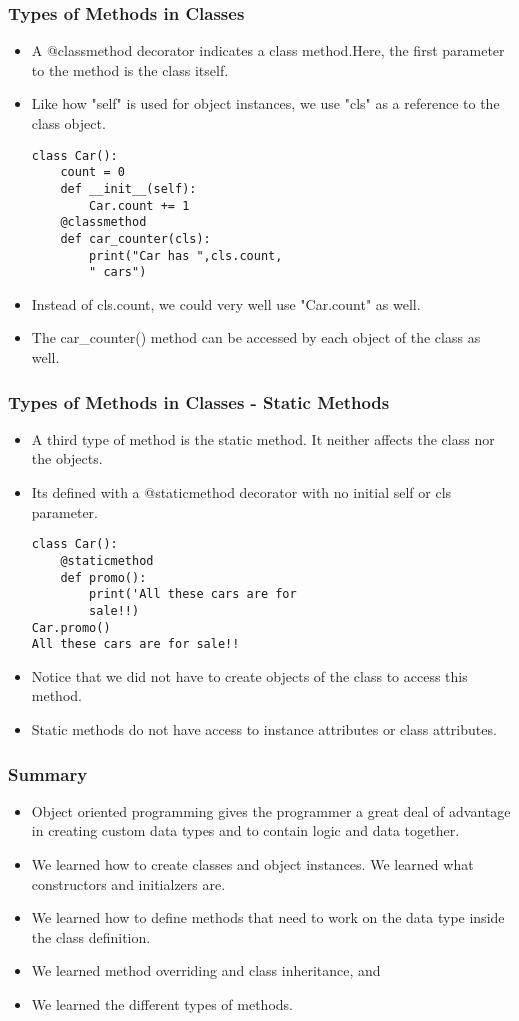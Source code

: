 \documentclass{beamer}
\begin{document}
\begin{frame}[fragile]
\frametitle{Types of Methods in Classes}
\begin{itemize}
\item A @classmethod decorator indicates a class method.Here, the first parameter to the method is the class itself.
\item Like how "self" is used for object instances, we use "cls" as a reference to the class object.
\begin{lstlisting}
class Car():
	count = 0
	def __init__(self):
		Car.count += 1
	@classmethod
	def car_counter(cls):
		print("Car has ",cls.count, 
		" cars")       
\end{lstlisting}
\item Instead of cls.count, we could very well use "Car.count" as well.
\item The car\_counter() method can be accessed by each object of the class as well.
\end{itemize}
\end{frame}

\begin{frame}[fragile]
\frametitle{Types of Methods in Classes - Static Methods}
\begin{itemize}
\item A third type of method is the static  method. It neither affects the class nor the objects.
\item Its defined with a @staticmethod decorator with no initial self or cls parameter.
\begin{lstlisting}
class Car():
	@staticmethod
	def promo():
		print('All these cars are for 
		sale!!)
Car.promo()
All these cars are for sale!!
\end{lstlisting}
\item Notice that we did not have to create objects of the class to access this method.
\item Static methods do not have access to instance attributes or class attributes.
\end{itemize}
\end{frame}

\begin{frame}
\frametitle{Summary}
\begin{itemize}
\item Object oriented programming gives the programmer a great deal of advantage in creating custom data types and to contain logic and data together.
\item We learned how to create classes and object instances. We learned what constructors and initialzers are.
\item We learned how to define methods that need to work on the data type inside the class definition.
\item We learned method overriding and class inheritance, and
\item We learned the different types  of methods.
\end{itemize}
\end{frame}
\end{document}
